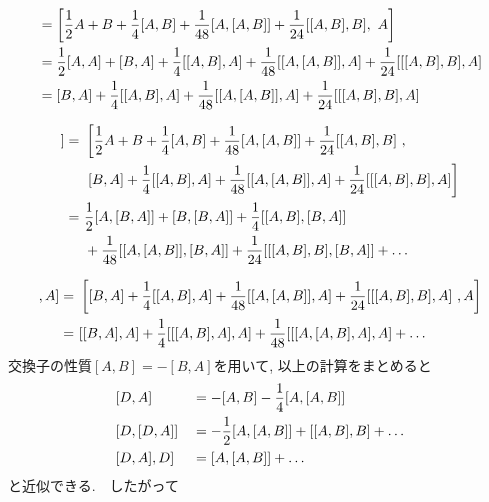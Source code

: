 \begin{align}
  [D, A]
  &=
  \left[
      \frac{1}{2}A + B
    + \frac{1}{4}[A, B]
    + \frac{1}{48}[A, [A,B]]
    + \frac{1}{24}[[A, B], B]
    ,~
    A
  \right]
  \notag \\
  &=
    \frac{1}{2} [A,A] + [B, A]
  + \frac{1}{4}[[A, B], A]
  + \frac{1}{48}[[A, [A,B]], A]
  + \frac{1}{24}[[[A,B], B], A]
  \notag \\
  &=
    [B,A]
  + \frac{1}{4}[[A, B], A]
  + \frac{1}{48}[[A, [A,B]], A]
  + \frac{1}{24}[[[A,B], B], A]
  \notag
\end{align}

\begin{align}
  [D, [D,A]]
  =~&
  \left[
    \frac{1}{2}A + B
    + \frac{1}{4}[A, B]
    + \frac{1}{48}[A, [A,B]]
    + \frac{1}{24}[[A, B], B]~,
  \right.
  \notag \\
  ~&
    \left.
    [B,A]
    + \frac{1}{4}[[A, B], A]
    + \frac{1}{48}[[A, [A,B]], A]
    + \frac{1}{24}[[[A,B], B], A]
  \right]
  \notag \\
  =~&
      \frac{1}{2}[A, [B,A]] + [B, [B,A]]
    + \frac{1}{4}[[A,B], [B,A]]
    \notag \\
    &
    + \frac{1}{48}[[A, [A,B]], [B,A]]
    + \frac{1}{24}[[[A,B],B], [B,A]]
    + \ldots
    \notag
\end{align}

\begin{align}
  [[D,A], A]
  =~&
  \left[
    [B,A]
    + \frac{1}{4}[[A, B], A]
    + \frac{1}{48}[[A, [A,B]], A]
    + \frac{1}{24}[[[A,B], B], A]
    ~,
    A
  \right]
  \notag \\
  =~&
    [[B,A], A]
  + \frac{1}{4} [[[A, B],A],A]
  + \frac{1}{48} [[[A, [A,B], A], A]
  + \ldots
  \notag
\end{align}
交換子の性質$[A, B] = -[B, A]$を用いて, 以上の計算をまとめると
\begin{alignat}{4}
  &[D, A]    &&= - [A,B] - \frac{1}{4}[A, [A,B]]
  \notag \\
  &[D,[D,A]] &&= -\frac{1}{2}[A, [A,B]] + [[A,B],B] + \ldots
  \notag \\
  &[D,A], D] &&=  [A, [A,B]] + \ldots
  \notag
\end{alignat}
と近似できる.　したがって

